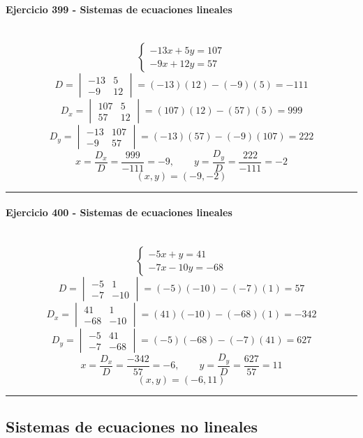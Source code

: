 \documentclass[10pt,a4paper]{article}
\newcommand{\res}[1]{\paragraph{#1}\mbox{}\\[-1.2em]}
\begin{document}
\res{Ejercicio 399 - Sistemas de ecuaciones lineales}
\[ \begin{cases}- 13 x + 5 y=107\\- 9 x + 12 y=57\end{cases} \]
\[ D=\begin{vmatrix}-13&5\\-9&12\end{vmatrix}=(-13)(12)-(-9)(5)=-111 \]
\[ D_x=\begin{vmatrix}107&5\\57&12\end{vmatrix}=(107)(12)-(57)(5)=999 \]
\[ D_y=\begin{vmatrix}-13&107\\-9&57\end{vmatrix}=(-13)(57)-(-9)(107)=222 \]
\[ x=\frac{D_x}{D}=\frac{999}{-111}=-9,\qquad y=\frac{D_y}{D}=\frac{222}{-111}=-2 \]
\[ \boxed{(x,y)=(-9,-2)} \]
\vspace{1mm}\hrule\vspace{2mm}
\res{Ejercicio 400 - Sistemas de ecuaciones lineales}
\[ \begin{cases}- 5 x + y=41\\- 7 x - 10 y=-68\end{cases} \]
\[ D=\begin{vmatrix}-5&1\\-7&-10\end{vmatrix}=(-5)(-10)-(-7)(1)=57 \]
\[ D_x=\begin{vmatrix}41&1\\-68&-10\end{vmatrix}=(41)(-10)-(-68)(1)=-342 \]
\[ D_y=\begin{vmatrix}-5&41\\-7&-68\end{vmatrix}=(-5)(-68)-(-7)(41)=627 \]
\[ x=\frac{D_x}{D}=\frac{-342}{57}=-6,\qquad y=\frac{D_y}{D}=\frac{627}{57}=11 \]
\[ \boxed{(x,y)=(-6,11)} \]
\vspace{1mm}\hrule\vspace{2mm}
\subsection{Sistemas de ecuaciones no lineales}
\end{document}
